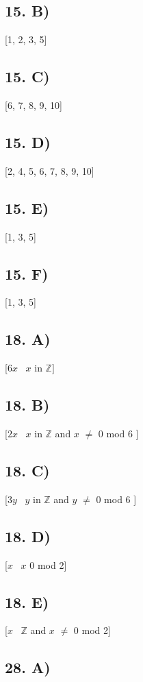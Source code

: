 \documentclass[12]{scrartcl}
\def\secondcircle{(210:1.75cm) circle (2.5cm)}
\def\thirdcircle{(330:1.75cm) circle (2.5cm)}
\begin{document}
\subsection*{15. B)}
[1, 2, 3, 5]
\subsection*{15. C)}
[6, 7, 8, 9, 10]
\subsection*{15. D)}
[2, 4, 5, 6, 7, 8, 9, 10]
\subsection*{15. E)}
[1, 3, 5]
\subsection*{15. F)}
[1, 3, 5]
\subsection*{18. A)}
[$6x$ \textbar \ $x$ in $\mathds{Z}]$
\subsection*{18. B)}
[$2x$ \textbar \ $x$ in  $\mathds{Z}$ and $x$ $\neq$ 0 mod 6 ]
\subsection*{18. C)}
[$3y$ \textbar \ $y$ in  $\mathds{Z}$ and $y$ $\neq$ 0 mod 6 ]
\subsection*{18. D)}
[$x$ \textbar \ $x$ $0$ mod 2]
\subsection*{18. E)}
[$x$ \textbar \ $\mathds{Z}$ and $x$ $\neq$ $0$ mod 2]
\subsection*{28. A)}
\end{document}
